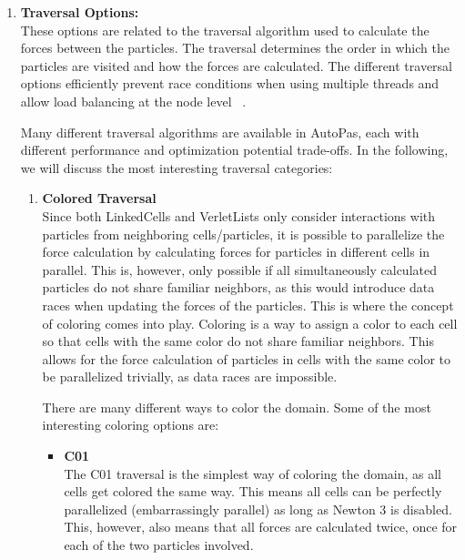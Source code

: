 \begin{enumerate}[label=\textbf{\arabic*.}]
      \item \textbf{Traversal Options:} \\
            These options are related to the traversal algorithm used to calculate the forces between the particles. The traversal determines the order in which the particles are visited and how the forces are calculated.
            The different traversal options efficiently prevent race conditions when using multiple threads and allow load balancing at the node level ~\cite{SECKLER2021101296}.

            Many different traversal algorithms are available in AutoPas, each with different performance and optimization potential trade-offs. In the following, we will discuss the most interesting traversal categories:

            \begin{enumerate}

                  \item \textbf{Colored Traversal} \\
                        Since both LinkedCells and VerletLists only consider interactions with particles from neighboring cells/particles, it is possible to parallelize the force calculation by calculating forces for particles in different cells in parallel. This is, however, only possible if all simultaneously calculated particles do not share familiar neighbors, as this would introduce data races when updating the forces of the particles. This is where the concept of coloring comes into play. Coloring is a way to assign a color to each cell so that cells with the same color do not share familiar neighbors. This allows for the force calculation of particles in cells with the same color to be parallelized trivially, as data races are impossible.

                        There are many different ways to color the domain. Some of the most interesting coloring options are:
                        \begin{itemize}
                              \item \textbf{C01} \\
                                    The C01 traversal is the simplest way of coloring the domain, as all cells get colored the same way. This means all cells can be perfectly parallelized (embarrassingly parallel) as long as Newton 3 is disabled. This, however, also means that all forces are calculated twice, once for each of the two particles involved.


\end{itemize}
\end{enumerate}
\end{enumerate}
